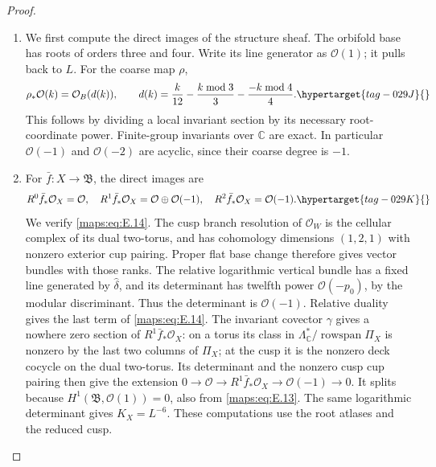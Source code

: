 \documentclass[11pt,a4paper]{article}
\numberwithin{equation}{section}
\theoremstyle{definition}
\begin{document}
\begin{proof}
\begin{enumerate}[label=\arabic*.,leftmargin=*]
\item We first compute the direct images of the structure sheaf.  The orbifold base has roots of orders three and four.
Write its line generator as $\mathcal O(1)$; it pulls back to $L$.
For the coarse map $\rho$,
\begin{equation}
 \rho_*\mathcal O(k)=\mathcal O_B(d(k)),\qquad
 d(k)=\frac{k}{12}-\frac{k\bmod3}{3}
                    -\frac{-k\bmod4}{4}.
 \hypertarget{tag-029J}{}\label{maps:eq:E.13}
\end{equation}
This follows by dividing a local invariant section by its necessary
root-coordinate power.  Finite-group invariants over $\mathbb C$
are exact.  In particular $\mathcal O(-1)$ and $\mathcal O(-2)$
are acyclic, since their coarse degree is $-1$.

\item For $\bar f:X\to\mathfrak B$, the direct images are
\begin{equation}
 R^0\bar f_*\mathcal O_X=\mathcal O,\quad
 R^1\bar f_*\mathcal O_X=\mathcal O\oplus\mathcal O(-1),
 \quad R^2\bar f_*\mathcal O_X=\mathcal O(-1).
 \hypertarget{tag-029K}{}\label{maps:eq:E.14}
\end{equation}
We verify \eqref{maps:eq:E.14}.
The cusp branch resolution of $\mathcal O_W$ is the cellular
complex of its dual two-torus, and has cohomology dimensions
$(1,2,1)$ with nonzero exterior cup pairing.  Proper flat base
change therefore gives vector bundles with those ranks.  The
relative logarithmic vertical bundle has a fixed line generated
by $\widehat\delta$, and its determinant has twelfth power
$\mathcal O(-p_0)$, by the modular discriminant.  Thus the
determinant is $\mathcal O(-1)$.  Relative duality gives the last
term of \eqref{maps:eq:E.14}.  The invariant covector $\gamma$ gives a nowhere
zero section of $R^1\bar f_*\mathcal O_X$: on a torus its class
in $\Lambda^*_{\mathbb C}/\operatorname{rowspan}\Pi_X$ is
nonzero by the last two columns of $\Pi_X$; at the cusp it is
the nonzero deck cocycle on the dual two-torus.  Its determinant
and the nonzero cusp cup pairing then give the extension
$0\to\mathcal O\to R^1\bar f_*\mathcal O_X
\to\mathcal O(-1)\to0$.  It splits because
$H^1(\mathfrak B,\mathcal O(1))=0$, also from \eqref{maps:eq:E.13}.
The same logarithmic determinant gives $K_X=L^{-6}$.
These computations use the root atlases and the reduced cusp.


\end{enumerate}
\end{proof}
\end{document}
